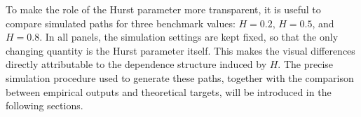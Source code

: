 To make the role of the Hurst parameter more transparent, it is useful to compare simulated paths for three benchmark values: \(H=0.2\), \(H=0.5\), and \(H=0.8\). In all panels, the simulation settings are kept fixed, so that the only changing quantity is the Hurst parameter itself. This makes the visual differences directly attributable to the dependence structure induced by \(H\). The precise simulation procedure used to generate these paths, together with the comparison between empirical outputs and theoretical targets, will be introduced in the following sections.

\begin{algorithm}[H]
\caption{Reading the fractional Brownian motion path comparison}
\DontPrintSemicolon
{}
\end{algorithm}




